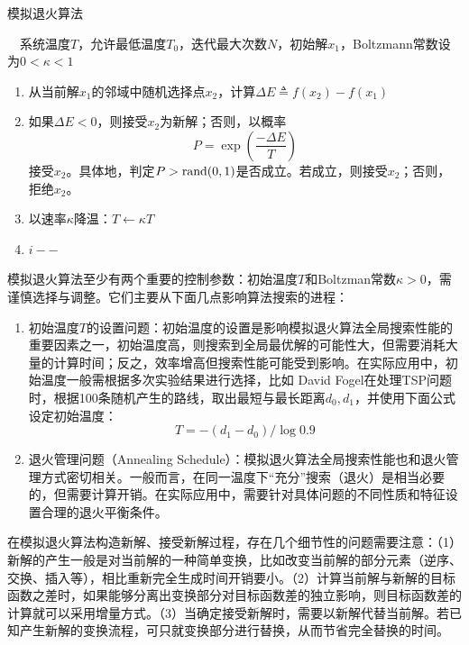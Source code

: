 \begin{algorithm}[htbp]
        \caption{模拟退火算法}
        \begin{algorithmic}
            \REQUIRE ~~系统温度$T$，允许最低温度$T_0$，迭代最大次数$N$，初始解$x_1$，Boltzmann常数设为$0<\kappa<1$\\
            \REPEAT
            \STATE
            \begin{enumerate}
                \item 从当前解$x_1$的邻域中随机选择点$x_2$，计算$\Delta E \triangleq f(x_2) - f(x_1)$
                \item 如果$\Delta E < 0$，则接受$x_2$为新解；否则，以概率
                \[
                    P = \exp(\frac{-\Delta E}{T})
                \]
                接受$x_2$。具体地，判定$P > \operatorname{\mathrm{rand}}(0,1)$是否成立。若成立，则接受$x_2$；否则，拒绝$x_2$。
                \item 以速率$\kappa$降温：$T \leftarrow \kappa T$
                \item $i--$
            \end{enumerate}
        \end{algorithmic}
\end{algorithm}

模拟退火算法至少有两个重要的控制参数：初始温度$T$和Boltzman常数$\kappa>0$，需谨慎选择与调整。它们主要从下面几点影响算法搜索的进程：
\begin{enumerate}[（1）]
  \item 初始温度$T$的设置问题：初始温度的设置是影响模拟退火算法全局搜索性能的重要因素之一，初始温度高，则搜索到全局最优解的可能性大，但需要消耗大量的计算时间；反之，效率增高但搜索性能可能受到影响。在实际应用中，初始温度一般需根据多次实验结果进行选择，比如
      David Fogel\cite{fogel1988evolutionary}在处理TSP问题时，根据100条随机产生的路线，取出最短与最长距离$d_0,d_1$，并使用下面公式设定初始温度：
      \[
        T = -(d_1-d_0)/\log 0.9
      \]
  \item 退火管理问题（Annealing Schedule）：模拟退火算法全局搜索性能也和退火管理方式密切相关。一般而言，在同一温度下“充分”搜索（退火）是相当必要的，但需要计算开销。在实际应用中，需要针对具体问题的不同性质和特征设置合理的退火平衡条件。
\end{enumerate}

在模拟退火算法构造新解、接受新解过程，存在几个细节性的问题需要注意：（1）新解的产生一般是对当前解的一种简单变换，比如改变当前解的部分元素（逆序、交换、插入等），相比重新完全生成时间开销要小。（2）计算当前解与新解的目标函数之差时，如果能够分离出变换部分对目标函数差的独立影响，则目标函数差的计算就可以采用增量方式。（3）当确定接受新解时，需要以新解代替当前解。若已知产生新解的变换流程，可只就变换部分进行替换，从而节省完全替换的时间。

